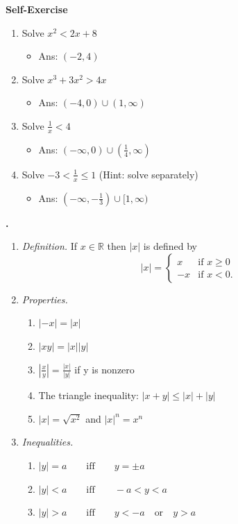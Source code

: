 \documentclass[t]{beamer}
\theoremstyle{plain}
\theoremstyle{definition}
\newcounter{heading}
\newcommand{\makeheading}[1]{\medskip\begin{large}\noindent\textbf{{#1}}\end{large}\smallskip}
\newcommand{\newhead}[1]{\medskip\stepcounter{heading}\noindent\textbf{\hspace{0.2cm}{#1}.}}
\newcommand{\RR}{\mathbb{R}}
\begin{document}
\begin{frame}
\makeheading{Self-Exercise}

\begin{enumerate}
\item Solve $x^2 < 2x + 8$ 
\begin{itemize}
	\item Ans: $(-2, 4)$
\end{itemize}

\item Solve $x^3 + 3x^2 > 4x$ 
\begin{itemize}
	\item Ans: $(-4, 0) \cup (1, \infty)$
\end{itemize}

\item Solve $\frac{1}{x} < 4$ 
 \begin{itemize}
	\item Ans: $(-\infty, 0) \cup (\frac{1}{4}, \infty)$
\end{itemize}

\item  Solve $-3 < \frac{1}{x} \leq 1$  (Hint: solve separately) 
\begin{itemize}
	\item Ans: $(-\infty, -\frac{1}{3}) \cup [1, \infty) $
\end{itemize}
\end{enumerate}

\end{frame}


\begin{frame}
\newhead{Absolute values}

\begin{enumerate}
\item \textit{Definition.} If $x\in\RR$ then $|x|$ is defined by
\[|x|=\begin{cases}
x&\mbox{if }x\geq0\\
-x&\mbox{if }x<0.
      \end{cases}\]
\item \textit{Properties.}
\begin{enumerate}
\item $|-x|=|x|$
\item $|xy|=|x||y|$
\item $\displaystyle\left|\frac{x}{y}\right|=\frac{|x|}{|y|}$ if y is nonzero
\item The triangle inequality: $|x+y|\leq|x|+|y|$
\item $|x|=\sqrt{x^2}$ and $|x|^n=x^n$
\end{enumerate}
\item \textit{Inequalities.}
\begin{enumerate}
\item $|y|=a\qquad\mbox{iff}\qquad y = \pm a$
\item $|y|<a\qquad\mbox{iff}\qquad -a<y<a$
\item $|y|>a\qquad\mbox{iff}\qquad y<-a\quad\mbox{or}\quad y>a$
\end{enumerate}
\end{enumerate}

\end{frame}
\end{document}
